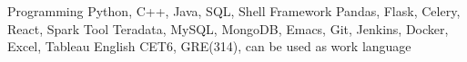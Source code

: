 \documentclass[11pt, a4paper, UTF8]{awesome-cv}
\begin{document}
\begin{cventries}
    
\end{cventries}



%
\begin{cvskills}
  \cvskill
    {Programming} %
    {Python, C++, Java, SQL, Shell} %
  \cvskill
    {Framework} %
    {Pandas, Flask, Celery, React, Spark} %
  \cvskill
    {Tool} %
    {Teradata, MySQL, MongoDB, Emacs, Git, Jenkins, Docker, Excel, Tableau} %
  \cvskill
    {English} %
    {CET6, GRE(314), can be used as work language} %
\end{cvskills}



%
%
%
%
%


\end{document}
